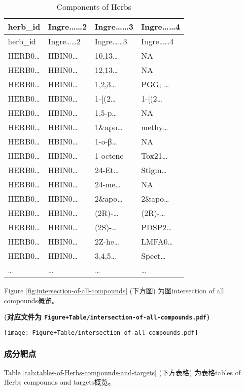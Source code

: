 \documentclass[
]{article}
\begin{document}
\begin{longtable}[]{@{}llll@{}}
\caption{\label{tab:Components-of-Herbs}Components of Herbs}\tabularnewline
\toprule
herb\_id & Ingre\ldots\ldots2 & Ingre\ldots\ldots3 & Ingre\ldots\ldots4\tabularnewline
\midrule
\endfirsthead
\toprule
herb\_id & Ingre\ldots\ldots2 & Ingre\ldots\ldots3 & Ingre\ldots\ldots4\tabularnewline
\midrule
\endhead
HERB0\ldots{} & HBIN0\ldots{} & 10,13\ldots{} & NA\tabularnewline
HERB0\ldots{} & HBIN0\ldots{} & 12,13\ldots{} & NA\tabularnewline
HERB0\ldots{} & HBIN0\ldots{} & 1,2,3\ldots{} & PGG; \ldots{}\tabularnewline
HERB0\ldots{} & HBIN0\ldots{} & 1-{[}(2\ldots{} & 1-{[}(2\ldots{}\tabularnewline
HERB0\ldots{} & HBIN0\ldots{} & 1,5-p\ldots{} & NA\tabularnewline
HERB0\ldots{} & HBIN0\ldots{} & 1\&apo\ldots{} & methy\ldots{}\tabularnewline
HERB0\ldots{} & HBIN0\ldots{} & 1-o-β\ldots{} & NA\tabularnewline
HERB0\ldots{} & HBIN0\ldots{} & 1-octene & Tox21\ldots{}\tabularnewline
HERB0\ldots{} & HBIN0\ldots{} & 24-Et\ldots{} & Stigm\ldots{}\tabularnewline
HERB0\ldots{} & HBIN0\ldots{} & 24-me\ldots{} & NA\tabularnewline
HERB0\ldots{} & HBIN0\ldots{} & 2\&apo\ldots{} & 2\&apo\ldots{}\tabularnewline
HERB0\ldots{} & HBIN0\ldots{} & (2R)-\ldots{} & (2R)-\ldots{}\tabularnewline
HERB0\ldots{} & HBIN0\ldots{} & (2S)-\ldots{} & PDSP2\ldots{}\tabularnewline
HERB0\ldots{} & HBIN0\ldots{} & 2Z-he\ldots{} & LMFA0\ldots{}\tabularnewline
HERB0\ldots{} & HBIN0\ldots{} & 3,4,5\ldots{} & Spect\ldots{}\tabularnewline
\ldots{} & \ldots{} & \ldots{} & \ldots{}\tabularnewline
\bottomrule
\end{longtable}

Figure \ref{fig:intersection-of-all-compounds} (下方图) 为图intersection of all compounds概览。

\textbf{(对应文件为 \texttt{Figure+Table/intersection-of-all-compounds.pdf})}

\def\@captype{figure}
\begin{center}
\texttt{[image: Figure+Table/intersection-of-all-compounds.pdf]}
\caption{Intersection of all compounds}\label{fig:intersection-of-all-compounds}
\end{center}

\hypertarget{ux6210ux5206ux9776ux70b9}{%
\subsubsection{成分靶点}\label{ux6210ux5206ux9776ux70b9}}

Table \ref{tab:tables-of-Herbs-compounds-and-targets} (下方表格) 为表格tables of Herbs compounds and targets概览。
\end{document}
